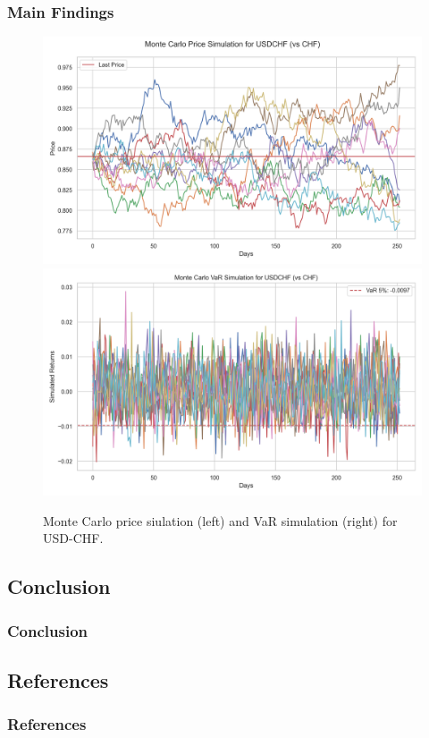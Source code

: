 \documentclass[10pt]{beamer}
\begin{document}
\begin{frame}
\frametitle{Main Findings}
\begin{figure}
    \centering  \includegraphics[width=0.48\linewidth]{reports/figures/monte_carlo_price_simulation_USDCHF_vs_CHF.png}  \label{fig:monte_carlo_price_simulation_USDCHF_vs_CHF}
    \includegraphics[width=0.49\linewidth]{reports/figures/monte_carlo_var_simulation_USDCHF_vs_CHF.png}  \label{fig:monte_carlo_var_simulation_USDCHF_vs_CHF}
    \caption{\footnotesize Monte Carlo price siulation (left) and VaR simulation (right) for USD-CHF.}
\end{figure}
\end{frame}
\begin{frame}
\section{Conclusion}
\frametitle{Conclusion}

\end{frame}
\begin{frame}
\section{References}
\frametitle{References}
\printbibliography
\end{frame}
\end{document}
